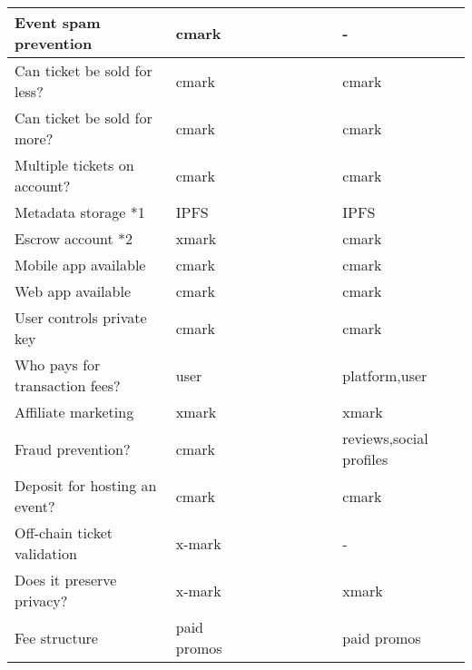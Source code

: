 \begin{landscape}
\begin{table}[]
\begin{tabular}{|l|l|l|l|l|l|l|l|l|}
Event spam prevention          & cmark       &      &         &            &         &                &                & -                        \\ \hline
Can ticket be sold for less?   & cmark       &      &         &            &         &                &                & cmark                    \\ \hline
Can ticket be sold for more?   & cmark       &      &         &            &         &                &                & cmark                    \\ \hline
Multiple tickets on account?   & cmark       &      &         &            &         &                &                & cmark                    \\ \hline
Metadata storage *1            & IPFS        &      &         &            &         &                &                & IPFS                     \\ \hline
Escrow account *2              & xmark       &      &         &            &         &                &                & cmark                    \\ \hline
Mobile app available           & cmark       &      &         &            &         &                &                & cmark                    \\ \hline
Web app available              & cmark       &      &         &            &         &                &                & cmark                    \\ \hline
User controls private key      & cmark       &      &         &            &         &                &                & cmark                    \\ \hline
Who pays for transaction fees? & user        &      &         &            &         &                &                & platform,user            \\ \hline
Affiliate marketing            & xmark       &      &         &            &         &                &                & xmark                    \\ \hline
Fraud prevention?              & cmark       &      &         &            &         &                &                & reviews,social profiles \\ \hline
Deposit for hosting an event?  & cmark       &      &         &            &         &                &                & cmark                    \\ \hline
Off-chain ticket validation    & x-mark      &      &         &            &         &                &                & -                        \\ \hline
Does it preserve privacy?      & x-mark      &      &         &            &         &                &                & xmark                    \\ \hline
Fee structure                  & paid promos &      &         &            &         &                &                & paid promos              \\ \hline
\end{tabular}
\end{table}


\end{landscape}
